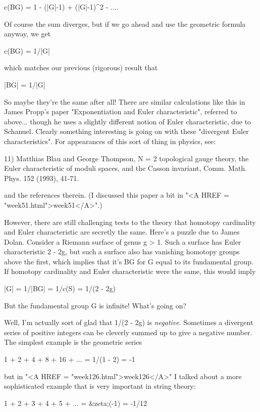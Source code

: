            c(BG) = 1  -  (|G|-1)  +  (|G|-1)^{2}  - ....

Of course the sum diverges, but if we go ahead and use the geometric
formula anyway, we get

                    c(BG) = 1/|G|

which matches our previous (rigorous) result that

                    |BG| = 1/|G|       

So maybe they're the same after all!   There are similar calculations like 
this in James Propp's paper "Exponentiation and Euler characteristic",
referred to above... though he uses a slightly different notion of Euler
characteristic, due to Schanuel.  Clearly something interesting is going
on with these "divergent Euler characteristics".  For appearances of this
sort of thing in physics, see:

11) Matthias Blau and George Thompson, N = 2 topological gauge 
theory, the Euler characteristic of moduli spaces, and the Casson 
invariant, Comm. Math. Phys. 152 (1993), 41-71. 

and the references therein.  (I discussed this paper a bit in "<A HREF = "week51.html">week51</A>".) 

However, there are still challenging tests to the theory that homotopy
cardinality and Euler characteristic are secretly the same.  Here's a
puzzle due to James Dolan.  Consider a Riemann surface of genus g > 1.
Such a surface has Euler characteristic 2 - 2g, but such a surface also
has vanishing homotopy groups above the first, which implies that it's
BG for G equal to its fundamental group.  If homotopy cardinality and
Euler characteristic were the same, this would imply

                 |G| = 1/|BG| = 1/c(S) = 1/(2 - 2g)

But the fundamental group G is infinite!  What's going on?  

Well, I'm actually sort of glad that 1/(2 - 2g) is \emph{negative}.   
Sometimes a divergent series of positive integers can be cleverly
summed up to give a negative number.  The simplest example is the
geometric series 

             1 + 2 + 4 + 8 + 16 + ... = 1/(1 - 2) = -1

but in "<A HREF = "week126.html">week126</A>" I talked about a more sophisticated example that
is very important in string theory:

             1 + 2 + 3 + 4 + 5 + ... = &zeta;(-1) = -1/12

